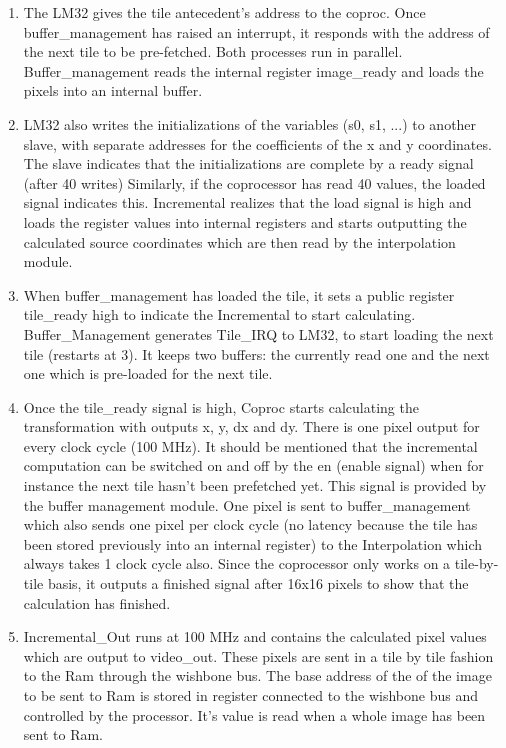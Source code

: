 \begin{enumerate}
\item The LM32 gives the tile antecedent's address to the coproc. Once buffer\_management has raised an interrupt, it responds with the address of the next tile to be pre-fetched. Both processes run in parallel. Buffer\_management reads the internal register image\_ready and loads the pixels into an internal buffer.

\item LM32 also writes the initializations of the variables (s0, s1, ...)  to another slave, with separate addresses for the coefficients of the x and y coordinates. The slave indicates that the initializations are complete by a ready signal (after 40 writes) Similarly, if the coprocessor has read 40 values, the loaded signal indicates this.
Incremental realizes that the load signal is high and loads the register values into internal registers and starts outputting the calculated source coordinates which are then read by the interpolation module.

\item When buffer\_management has loaded the tile, it sets a public register tile\_ready high to indicate the Incremental to start calculating.
Buffer\_Management generates Tile\_IRQ to LM32, to start loading the next tile (restarts at 3). 
It keeps two buffers: the currently read one and the next one which is pre-loaded for the next 	tile.

\item Once the tile\_ready signal is high, Coproc starts calculating the transformation with outputs x, y, dx and dy. There is one pixel output for every clock cycle (100 MHz). It should be mentioned that the incremental computation can be switched on and off by the en (enable signal) when for instance the next tile hasn't been prefetched yet. This signal is provided by the buffer management module.
One pixel is sent to buffer\_management which also sends one pixel per clock cycle (no latency because the tile has been stored previously into an internal register) to the Interpolation which always takes 1 clock cycle also.
Since the coprocessor only works on a tile-by-tile basis, it outputs a finished signal after 16x16 pixels to show that the calculation has finished.

\item Incremental\_Out runs at 100 MHz and contains the calculated pixel values which are output to video\_out. These pixels are sent in a tile by tile fashion to the Ram through the wishbone bus. The base address of the of the image to be sent to Ram is stored in register connected to the wishbone bus and controlled by the processor. It's value is read when a whole image has been sent to Ram. 


\end{enumerate}
